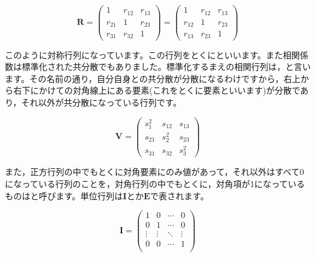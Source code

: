 \documentclass{ltjsbook}
\begin{document}
\begin{equation*}
	\bm{R} =
	\begin{pmatrix}
		1      & r_{12} & r_{13} \\
		r_{21} & 1      & r_{23} \\
		r_{31} & r_{32} & 1
	\end{pmatrix}=
	\begin{pmatrix}
		1      & r_{12} & r_{13} \\
		r_{12} & 1      & r_{23} \\
		r_{13} & r_{23} & 1
	\end{pmatrix}
\end{equation*}

このように対称行列になっています。この行列をとくにといいます。また相関係数は標準化された共分散でもありました。標準化するまえの相関行列は，と言います。その名前の通り，自分自身との共分散が分散になるわけですから，右上から右下にかけての対角線上にある要素(これをとくに要素といいます)が分散であり，それ以外が共分散になっている行列です。

\begin{equation*}
	\bm{V} =
	\begin{pmatrix}
		s_1^2  & s_{12} & s_{13} \\
		s_{21} & s_2^2  & s_{23} \\
		s_{31} & s_{32} & s_3^2
	\end{pmatrix}
\end{equation*}

また，正方行列の中でもとくに対角要素にのみ値があって，それ以外はすべて$0$になっている行列のことを，対角行列の中でもとくに，対角項が1になっているものはと呼びます。単位行列は$\bm{I}$とか$\bm{E}$で表されます。


\begin{equation*}
	\bm{I} =
	\begin{pmatrix}
		1      & 0      & \cdots & 0      \\
		0      & 1      & \cdots & 0      \\
		\vdots & \vdots & \ddots & \vdots \\
		0      & 0      & \cdots & 1      \\
	\end{pmatrix}
\end{equation*}
\end{document}

